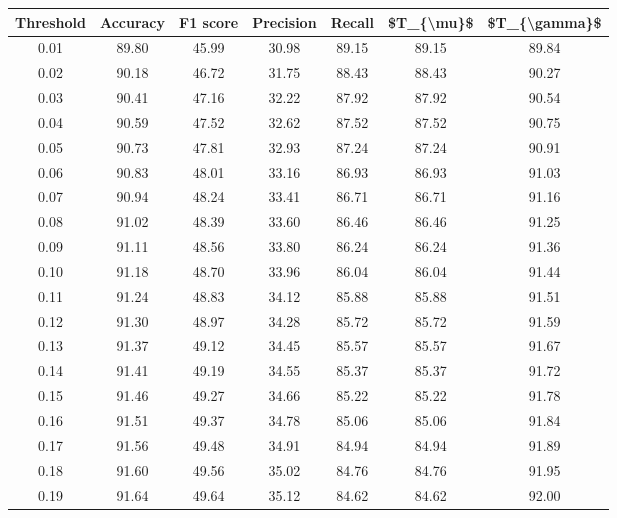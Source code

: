 \begin{tabular}{|c|c|c|c|c|c|c|}
\hline
 Threshold &  Accuracy &  F1 score &  Precision &  Recall &  \$T\_\{\textbackslash mu\}\$ &  \$T\_\{\textbackslash gamma\}\$ \\
\hline
      0.01 &     89.80 &     45.99 &      30.98 &   89.15 &      89.15 &         89.84 \\
      0.02 &     90.18 &     46.72 &      31.75 &   88.43 &      88.43 &         90.27 \\
      0.03 &     90.41 &     47.16 &      32.22 &   87.92 &      87.92 &         90.54 \\
      0.04 &     90.59 &     47.52 &      32.62 &   87.52 &      87.52 &         90.75 \\
      0.05 &     90.73 &     47.81 &      32.93 &   87.24 &      87.24 &         90.91 \\
      0.06 &     90.83 &     48.01 &      33.16 &   86.93 &      86.93 &         91.03 \\
      0.07 &     90.94 &     48.24 &      33.41 &   86.71 &      86.71 &         91.16 \\
      0.08 &     91.02 &     48.39 &      33.60 &   86.46 &      86.46 &         91.25 \\
      0.09 &     91.11 &     48.56 &      33.80 &   86.24 &      86.24 &         91.36 \\
      0.10 &     91.18 &     48.70 &      33.96 &   86.04 &      86.04 &         91.44 \\
      0.11 &     91.24 &     48.83 &      34.12 &   85.88 &      85.88 &         91.51 \\
      0.12 &     91.30 &     48.97 &      34.28 &   85.72 &      85.72 &         91.59 \\
      0.13 &     91.37 &     49.12 &      34.45 &   85.57 &      85.57 &         91.67 \\
      0.14 &     91.41 &     49.19 &      34.55 &   85.37 &      85.37 &         91.72 \\
      0.15 &     91.46 &     49.27 &      34.66 &   85.22 &      85.22 &         91.78 \\
      0.16 &     91.51 &     49.37 &      34.78 &   85.06 &      85.06 &         91.84 \\
      0.17 &     91.56 &     49.48 &      34.91 &   84.94 &      84.94 &         91.89 \\
      0.18 &     91.60 &     49.56 &      35.02 &   84.76 &      84.76 &         91.95 \\
      0.19 &     91.64 &     49.64 &      35.12 &   84.62 &      84.62 &         92.00 \\

\end{tabular}
